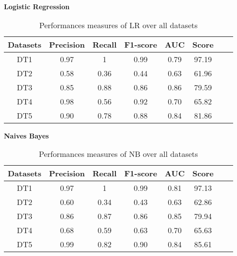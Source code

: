 \documentclass[10pt,a4paper]{article}
\begin{document}
\begin{center}
\textbf{Logistic Regression}
\end{center}
\begin{table}[!ht]
\centering
\begin{tabular}{*{6}{c}l r}
  \toprule
  \textbf{Datasets} & \textbf{Precision} & \textbf{Recall} & \textbf{F1-score}&\textbf{AUC} &\textbf{Score}\\
   \midrule
  DT1 &0.97 &1   &0.99 &0.79 &97.19 \\
  DT2 & 0.58 &0.36   &0.44&0.63&61.96\\
  DT3 &0.85 &0.88 &0.86&0.86&79.59\\
  DT4 &0.98 &0.56&0.92&0.70&65.82\\
  DT5 & 0.90&0.78&0.88&0.84&81.86\\
  
  
    \bottomrule
\end{tabular}
\caption{Performances measures of LR over all datasets}\label{perf-measure-dt1}
\end{table}
\newpage
\begin{center}
\textbf{Naives Bayes}

\end{center}
\begin{table}[!ht]
\centering
\begin{tabular}{*{6}{c}l r}
  \toprule
  \textbf{Datasets} & \textbf{Precision} & \textbf{Recall} & \textbf{F1-score}&\textbf{AUC} &\textbf{Score}\\
   \midrule
  DT1 &0.97 &1   &0.99 &0.81 &97.13 \\
  DT2 & 0.60 &0.34   &0.43&0.63&62.86 \\
  DT3 &0.86 &0.87 &0.86&0.85&79.94\\
  DT4 &0.68 &0.59&0.63&0.70&65.63\\
  DT5 &0.99 &0.82&0.90&0.84&85.61\\
  
  
    \bottomrule
\end{tabular}
\caption{Performances measures of NB over all datasets}\label{perf-measure-dt1}
\end{table}
\end{document}
